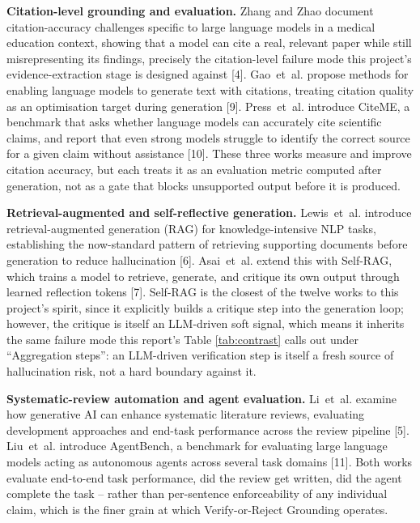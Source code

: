 \documentclass[12pt,a4paper]{report}
\begin{document}
\textbf{Citation-level grounding and evaluation.} Zhang and Zhao document
citation-accuracy challenges specific to large language models in a medical
education context, showing that a model can cite a real, relevant paper while
still misrepresenting its findings, precisely the citation-level failure mode
this project's evidence-extraction stage is designed against
[4]. Gao~et~al. propose methods for enabling language
models to generate text with citations, treating citation quality as an
optimisation target during generation [9]. Press~et~al.
introduce CiteME, a benchmark that asks whether language models can accurately
cite scientific claims, and report that even strong models struggle to
identify the correct source for a given claim without assistance
[10]. These three works measure and improve citation
accuracy, but each treats it as an evaluation metric computed after generation,
not as a gate that blocks unsupported output before it is produced.

\textbf{Retrieval-augmented and self-reflective generation.} Lewis~et~al.
introduce retrieval-augmented generation (RAG) for knowledge-intensive NLP
tasks, establishing the now-standard pattern of retrieving supporting documents
before generation to reduce hallucination [6].
Asai~et~al. extend this with Self-RAG, which trains a model to retrieve,
generate, and critique its own output through learned reflection tokens
[7]. Self-RAG is the closest of the twelve works to this
project's spirit, since it explicitly builds a critique step into the
generation loop; however, the critique is itself an LLM-driven soft signal,
which means it inherits the same failure mode this report's Table
\ref{tab:contrast} calls out under ``Aggregation steps'': an LLM-driven
verification step is itself a fresh source of hallucination risk, not a
hard boundary against it.

\textbf{Systematic-review automation and agent evaluation.} Li~et~al. examine
how generative AI can enhance systematic literature reviews, evaluating
development approaches and end-task performance across the review pipeline
[5]. Liu~et~al. introduce AgentBench, a benchmark for
evaluating large language models acting as autonomous agents across several
task domains [11]. Both works evaluate end-to-end task
performance, did the review get written, did the agent complete the task --
rather than per-sentence enforceability of any individual claim, which is the
finer grain at which Verify-or-Reject Grounding operates.
\end{document}
